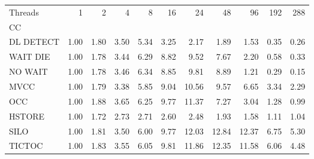 \begin{tabular}{lrrrrrrrrrr}
\toprule
Threads &  1   &  2   &  4   &  8   &  16  &   24  &   48  &   96  &  192 &  288 \\
CC        &      &      &      &      &      &       &       &       &      &      \\
\midrule
DL DETECT & 1.00 & 1.80 & 3.50 & 5.34 & 3.25 &  2.17 &  1.89 &  1.53 & 0.35 & 0.26 \\
WAIT DIE  & 1.00 & 1.78 & 3.44 & 6.29 & 8.82 &  9.52 &  7.67 &  2.20 & 0.58 & 0.33 \\
NO WAIT   & 1.00 & 1.78 & 3.46 & 6.34 & 8.85 &  9.81 &  8.89 &  1.21 & 0.29 & 0.15 \\
MVCC      & 1.00 & 1.79 & 3.38 & 5.85 & 9.04 & 10.56 &  9.57 &  6.65 & 3.34 & 2.29 \\
OCC       & 1.00 & 1.88 & 3.65 & 6.25 & 9.77 & 11.37 &  7.27 &  3.04 & 1.28 & 0.99 \\
HSTORE    & 1.00 & 1.72 & 2.73 & 2.71 & 2.60 &  2.48 &  1.93 &  1.58 & 1.11 & 1.04 \\
SILO      & 1.00 & 1.81 & 3.50 & 6.00 & 9.77 & 12.03 & 12.84 & 12.37 & 6.75 & 5.30 \\
TICTOC    & 1.00 & 1.83 & 3.55 & 6.05 & 9.81 & 11.86 & 12.35 & 11.58 & 6.06 & 4.48 \\
\bottomrule
\end{tabular}

